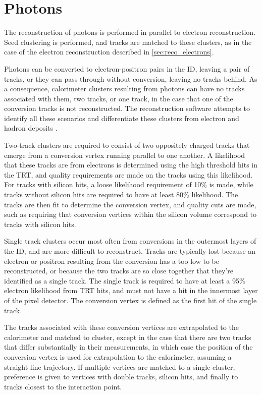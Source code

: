 \section{Photons}
\label{sec:reco_photons}

The reconstruction of photons is performed in parallel to electron reconstruction. Seed clustering is performed, and tracks are matched to these clusters, as in the case of the electron reconstruction described in \autoref{sec:reco_electrons}. 

Photons can be converted to electron-positron pairs in the \ac{ID}, leaving a pair of tracks, or they can pass through without conversion, leaving no tracks behind. As a consequence, calorimeter clusters resulting from photons can have no tracks associated with them, two tracks, or one track, in the case that one of the conversion tracks is not reconstructed. The reconstruction software attempts to identify all these scenarios and differentiate these clusters from electron and hadron deposits \cite{1606.01813}.

Two-track clusters are required to consist of two oppositely charged tracks that emerge from a conversion vertex running parallel to one another. A likelihood that these tracks are from electrons is determined using the high threshold hits in the \ac{TRT}, and quality requirements are made on the tracks using this likelihood. For tracks with silicon hits, a loose likelihood requirement of 10\% is made, while tracks without silicon hits are required to have at least 80\% likelihood. The tracks are then fit to determine the conversion vertex, and quality cuts are made, such as requiring that conversion vertices within the silicon volume correspond to tracks with silicon hits. 

Single track clusters occur most often from conversions in the outermost layers of the \ac{ID}, and are more difficult to reconstruct. Tracks are typically lost because an electron or positron resulting from the conversion has a \pt too low to be reconstructed, or because the two tracks are so close together that they're identified as a single track. The single track is required to have at least a 95\% electron likelihood from \ac{TRT} hits, and must not have a hit in the innermost layer of the pixel detector. The conversion vertex is defined as the first hit of the single track. 

The tracks associated with these conversion vertices are extrapolated to the calorimeter and matched to cluster, except in the case that there are two tracks that differ substantially in their \pt measurements, in which case the position of the conversion vertex is used for extrapolation to the calorimeter, assuming a straight-line trajectory. If multiple vertices are matched to a single cluster, preference is given to vertices with double tracks, silicon hits, and finally to tracks closest to the interaction point. 


